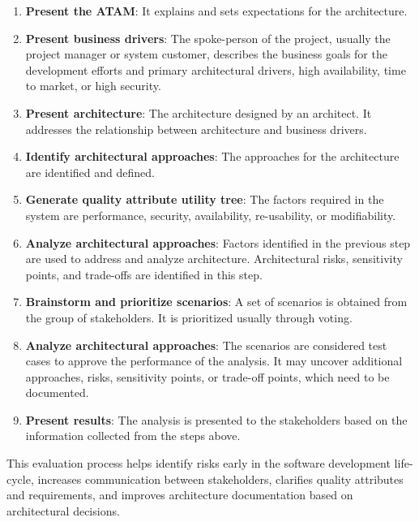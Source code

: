 \documentclass[12pt,a4paper]{article}
\begin{document}
{\begin{enumerate}

\item  \textbf{Present the ATAM}: It explains and sets expectations for the architecture. \cite{r39}
\item \textbf{Present business drivers}: The spoke-person of the project, usually the project manager or system customer, describes the business goals for the development efforts and primary architectural drivers, high availability, time to market, or high security. \cite{r39} 
\item \textbf{Present architecture}: The architecture designed by an architect. It addresses the relationship between architecture and business drivers. \cite{r39}
\item \textbf{Identify architectural approaches}: The approaches for the architecture are identified and defined. \cite{r39}
\item \textbf{Generate quality attribute utility tree}: The factors required in the system are performance, security, availability, re-usability, or modifiability. \cite{r39}
\item \textbf{Analyze architectural approaches}: Factors identified in the previous step are used to address and analyze architecture. Architectural risks, sensitivity points, and trade-offs are identified in this step. \cite{r39}

\item \textbf{Brainstorm and prioritize scenarios}: A set of scenarios is obtained from the group of stakeholders. It is prioritized usually through voting. \cite{r39}

\item \textbf{Analyze architectural approaches}: The scenarios are considered test cases to approve the performance of the analysis. It may uncover additional approaches, risks, sensitivity points, or trade-off points, which need to be documented. \cite{r39}

\item \textbf{Present results}: The analysis is presented to the stakeholders based on the information collected from the steps above. \cite{r39}

\end{enumerate}

This evaluation process helps identify risks early in the software development life-cycle, increases communication between stakeholders, clarifies quality attributes and requirements, and improves architecture documentation based on architectural decisions. \cite{r39}

}
\end{document}
